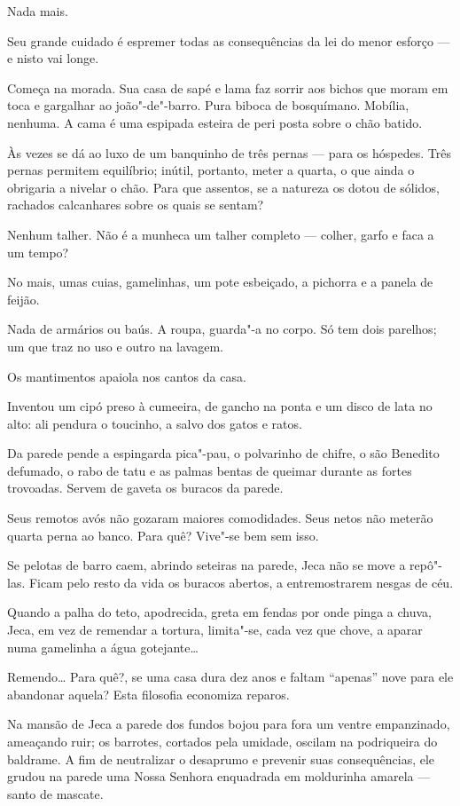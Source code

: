 Nada mais.

Seu grande cuidado é espremer todas as consequências da lei do menor
esforço --- e nisto vai longe.

Começa na morada. Sua casa de sapé e lama faz sorrir aos bichos que
moram em toca e gargalhar ao joão"-de"-barro. Pura biboca de bosquímano.
Mobília, nenhuma. A cama é uma espipada esteira de peri posta sobre o
chão batido.

Às vezes se dá ao luxo de um banquinho de três pernas --- para os
hóspedes. Três pernas permitem equilíbrio; inútil, portanto, meter a
quarta, o que ainda o obrigaria a nivelar o chão. Para que assentos, se
a natureza os dotou de sólidos, rachados calcanhares sobre os quais se
sentam?

Nenhum talher. Não é a munheca um talher completo --- colher, garfo e
faca a um tempo?

No mais, umas cuias, gamelinhas, um pote esbeiçado, a pichorra e a
panela de feijão.

Nada de armários ou baús. A roupa, guarda"-a no corpo. Só tem dois
parelhos; um que traz no uso e outro na lavagem.

Os mantimentos apaiola nos cantos da casa.

Inventou um cipó preso à cumeeira, de gancho na ponta e um disco de lata
no alto: ali pendura o toucinho, a salvo dos gatos e ratos.

Da parede pende a espingarda pica"-pau, o polvarinho de chifre, o são
Benedito defumado, o rabo de tatu e as palmas bentas de queimar durante
as fortes trovoadas. Servem de gaveta os buracos da parede.

Seus remotos avós não gozaram maiores comodidades. Seus netos não
meterão quarta perna ao banco. Para quê? Vive"-se bem sem isso.

Se pelotas de barro caem, abrindo seteiras na parede, Jeca não se move a
repô"-las. Ficam pelo resto da vida os buracos abertos, a entremostrarem
nesgas de céu.

Quando a palha do teto, apodrecida, greta em fendas por onde pinga a
chuva, Jeca, em vez de remendar a tortura, limita"-se, cada vez que
chove, a aparar numa gamelinha a água gotejante\ldots{}

Remendo\ldots{} Para quê?, se uma casa dura dez anos e faltam ``apenas'' nove
para ele abandonar aquela? Esta filosofia economiza reparos.

Na mansão de Jeca a parede dos fundos bojou para fora um ventre
empanzinado, ameaçando ruir; os barrotes, cortados pela umidade, oscilam
na podriqueira do baldrame. A fim de neutralizar o desaprumo e prevenir
suas consequências, ele grudou na parede uma Nossa Senhora enquadrada em
moldurinha amarela --- santo de mascate.

